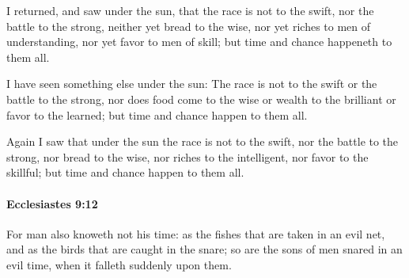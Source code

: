 			\begin{versebox}
					\item[BHS] 
					\item[LXX] 
					\item[ASV] I returned, and saw under the sun, that the race is not to the swift, nor the battle to the strong, neither yet bread to the wise, nor yet riches to men of understanding, nor yet favor to men of skill; but time and chance happeneth to them all.
					\item[NIV] I have seen something else under the sun: The race is not to the swift or the battle to the strong, nor does food come to the wise or wealth to the brilliant or favor to the learned; but time and chance happen to them all.
					\item[NRSV] Again I saw that under the sun the race is not to the swift, nor the battle to the strong, nor bread to the wise, nor riches to the intelligent, nor favor to the skillful; but time and chance happen to them all.
			\end{versebox}

		\paragraph{Ecclesiastes 9:12} %
			\label{ECCLESIASTES-9-12}

			For man also knoweth not his time: as the fishes that are taken in an evil net, and as the birds that are caught in the snare; so are the sons of men snared in an evil time, when it falleth suddenly upon them.

